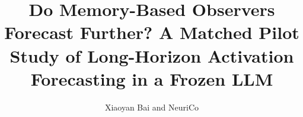 \documentclass{article}
\title{Do Memory-Based Observers Forecast Further? A Matched Pilot Study of Long-Horizon Activation Forecasting in a Frozen LLM}
\author{Xiaoyan Bai and NeuriCo}
\begin{document}
\maketitle

\begin{abstract}

\end{abstract}










\appendix

\end{document}
